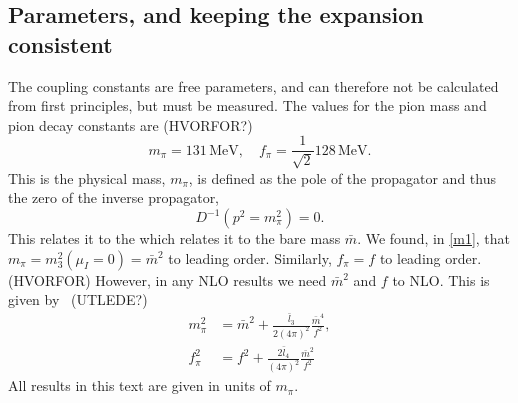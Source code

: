 \subsection*{Parameters, and keeping the expansion consistent}
The coupling constants are free parameters, and can therefore not be calculated from first principles, but must be measured.
The values for the pion mass and pion decay constants are (HVORFOR?)
\begin{equation}
    m_\pi = 131 \, \mathrm{MeV}, \quad f_\pi = \frac{1}{\sqrt 2} 128 \, \mathrm{MeV}.
\end{equation}
This is the physical mass, $m_\pi$, is defined as the pole of the propagator and thus the zero of the inverse propagator,
\begin{equation}
    D^{-1}(p^2 = m_\pi^2) = 0.
\end{equation}
This relates it to the which relates it to the bare mass $\bar m$.
We found, in \cref{m1}, that $m_\pi = m_3^2(\mu_I = 0) = \bar m^2$ to leading order.
Similarly, $f_\pi = f$ to leading order. (HVORFOR)
However, in any NLO results we need $\bar m^2$ and $f$ to NLO.
This is given by~\cite{Andersen:two-flavor-chpt} (UTLEDE?)
\begin{align}
    \label{equation bare mass}
    m_\pi^2 & = \bar m^2 + \frac{\bar l_3}{2 (4\pi)^2} \frac{\bar m^4}{f^2}, \\
    \label{equation bare decay constant}
    f_\pi^2 & = f^2 + \frac{2\bar l_4}{(4\pi)^2} \frac{\bar m^2}{f^2}
\end{align}
All results in this text are given in units of $m_\pi$.

